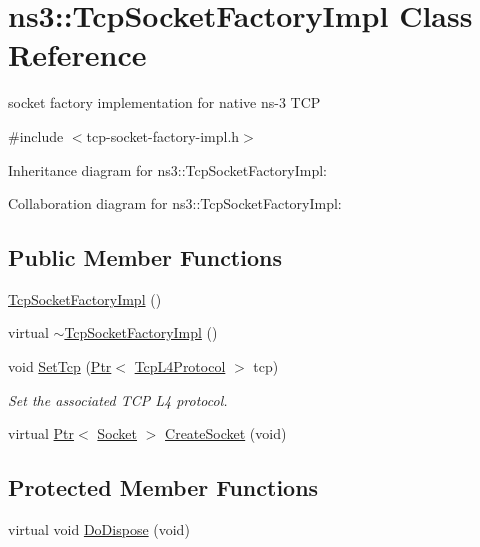 \hypertarget{classns3_1_1TcpSocketFactoryImpl}{}\section{ns3\+:\+:Tcp\+Socket\+Factory\+Impl Class Reference}
\label{classns3_1_1TcpSocketFactoryImpl}


socket factory implementation for native ns-\/3 T\+CP  




{\ttfamily \#include $<$tcp-\/socket-\/factory-\/impl.\+h$>$}



Inheritance diagram for ns3\+:\+:Tcp\+Socket\+Factory\+Impl\+:


Collaboration diagram for ns3\+:\+:Tcp\+Socket\+Factory\+Impl\+:
\subsection*{Public Member Functions}
\begin{DoxyCompactItemize}
\item 
\hyperlink{classns3_1_1TcpSocketFactoryImpl_ac9fb27d597541eb079787267b3663b07}{Tcp\+Socket\+Factory\+Impl} ()
\item 
virtual \hyperlink{classns3_1_1TcpSocketFactoryImpl_ae14cc71c02ae0f0408d573e62c7b1774}{$\sim$\+Tcp\+Socket\+Factory\+Impl} ()
\item 
void \hyperlink{classns3_1_1TcpSocketFactoryImpl_a326c48155313ffdfc0e84d978b08d8a5}{Set\+Tcp} (\hyperlink{classns3_1_1Ptr}{Ptr}$<$ \hyperlink{classns3_1_1TcpL4Protocol}{Tcp\+L4\+Protocol} $>$ tcp)
\begin{DoxyCompactList}\small\item\em Set the associated T\+CP L4 protocol. \end{DoxyCompactList}\item 
virtual \hyperlink{classns3_1_1Ptr}{Ptr}$<$ \hyperlink{classns3_1_1Socket}{Socket} $>$ \hyperlink{classns3_1_1TcpSocketFactoryImpl_afe62afbf3a6ad1458a33b810e2a4a0a8}{Create\+Socket} (void)
\end{DoxyCompactItemize}
\subsection*{Protected Member Functions}
\begin{DoxyCompactItemize}
\item 
virtual void \hyperlink{classns3_1_1TcpSocketFactoryImpl_ab0afb84a3d96c57db291b75b2611eb7f}{Do\+Dispose} (void)
\end{DoxyCompactItemize}
